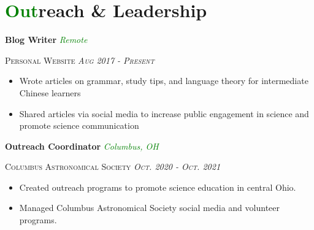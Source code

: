 \documentclass[11pt]{article}
\begin{document}
\section*{\textcolor{green}{Out}reach \& Leadership}

\noindent \textbf{Blog Writer} \hfill \textcolor{green}{\textit{Remote}}

\noindent \textsc{Personal Website \hfill {\textit{Aug 2017 - Present}}}
\vspace{-2mm}
\begin{itemize}
    \setlength{\itemsep}{0cm}
    \setlength{\parskip}{0cm}
    \addtolength{\leftskip}{-5mm}
    \item Wrote articles on grammar, study tips, and language theory for intermediate Chinese learners
    \item Shared articles via social media to increase public engagement in science and promote
    science communication
\end{itemize}

\noindent \textbf{Outreach Coordinator} \hfill {\textit{\textcolor{green}{Columbus, OH}}}

\noindent \textsc{Columbus Astronomical Society \hfill {\textit{Oct. 2020 - Oct. 2021}}}
\vspace{-2mm}
\begin{itemize}
    \setlength{\itemsep}{0cm}
    \setlength{\parskip}{0cm}
    \addtolength{\leftskip}{-5mm}
    \item Created outreach programs to promote science education in central Ohio.
    \item Managed Columbus Astronomical Society social media and volunteer programs. 
\end{itemize}




\end{document}
